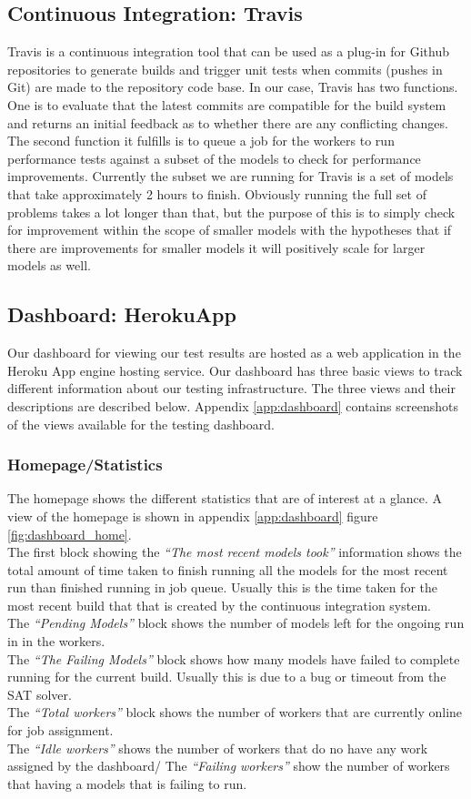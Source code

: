 \documentclass[11pt]{article}
\theoremstyle{definition}
\begin{document}
\subsection{Continuous Integration: Travis}
Travis \cite{ref:travis} is a continuous integration tool that can be used as a plug-in for Github repositories to generate builds and trigger unit tests when commits (pushes in Git) are made to the repository code base. In our case, Travis has two functions. One is to evaluate that the latest commits are compatible for the build system and returns an initial feedback as to whether there are any conflicting changes. The second function it fulfills is to queue a job for the workers to run performance tests against a subset of the models to check for performance improvements. Currently the subset we are running for Travis is a set of models that take approximately 2 hours to finish. Obviously running the full set of problems takes a lot longer than that, but the purpose of this is to simply check for improvement within the scope of smaller models with the hypotheses that if there are improvements for smaller models it will positively scale for larger models as well.

\subsection{Dashboard: HerokuApp}
Our dashboard for viewing our test results are hosted as a web application in the Heroku App engine hosting service. Our dashboard has three basic views to track different information about our testing infrastructure. The three views and their descriptions are described below. Appendix \ref{app:dashboard} contains screenshots of the views available for the testing dashboard.

\subsubsection{Homepage/Statistics}
The homepage shows the different statistics that are of interest at a glance. A view of the homepage is shown in appendix \ref{app:dashboard} figure \ref{fig:dashboard_home}. 
\\
The first block showing the \emph{``The most recent models took''} information shows the total amount of time taken to finish running all the models for the most recent run than finished running in job queue. Usually this is the time taken for the most recent build that that is created by the continuous integration system. 
\\
The \emph{``Pending Models''} block shows the number of models left for the ongoing run in in the workers.
\\
The \emph{``The Failing Models''} block shows how many models have failed to complete running for the current build. Usually this is due to a bug or timeout from the SAT solver.
\\
The \emph{``Total workers''} block shows the number of workers that are currently online for job assignment.
\\
The \emph{``Idle workers''} shows the number of workers that do no have any work assigned by the dashboard/
The \emph{``Failing workers''} show the number of workers that having a models that is failing to run.
\end{document}
